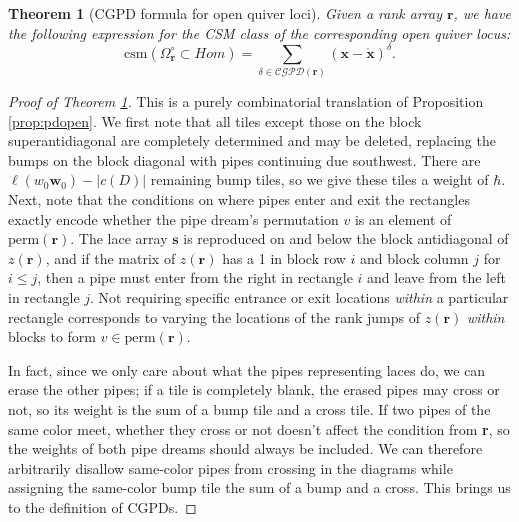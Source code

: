 \documentclass[10pt,a4paper]{amsart}
\newtheorem{theorem}{Theorem}
\newcommand{\csm}{\textrm{csm}}
\newcommand{\perm}{\textrm{perm}}
\begin{document}
\begin{theorem}[CGPD formula for open quiver loci]\label{thm:cgpdopen}
Given a rank array $\mathbf{r}$, we have the following expression for the CSM class of the corresponding open quiver locus:
\[\csm(\Omega_{\mathbf{r}}^\circ \subset Hom) = \sum_{\delta \in \mathcal{CGPD}(\mathbf{r})} (\mathbf{x}-\mathring{\mathbf{x}})^\delta.\]
\end{theorem}

\begin{proof}[Proof of Theorem \ref{thm:cgpdopen}]
This is a purely combinatorial translation of Proposition \ref{prop:pdopen}. We first note that all tiles except those on the block superantidiagonal are completely determined and may be deleted, replacing the bumps on the block diagonal with pipes continuing due southwest. There are $\ell(w_0\mathbf{w}_0)-|c(D)|$ remaining bump tiles, so we give these tiles a weight of $\hbar$. Next, note that the conditions on where pipes enter and exit the rectangles exactly encode whether the pipe dream's permutation $v$ is an element of $\perm(\mathbf{r})$. The lace array $\mathbf{s}$ is reproduced on and below the block antidiagonal of $z(\mathbf{r})$, and if the matrix of $z(\mathbf{r})$ has a 1 in block row $i$ and block column $j$ for $i \leq j$, then a pipe must enter from the right in rectangle $i$ and leave from the left in rectangle $j$.
Not requiring specific entrance or exit locations \emph{within} a particular rectangle corresponds to varying the locations of the rank jumps of $z(\mathbf{r})$ \emph{within} blocks to form $v \in \perm(\mathbf{r})$.

In fact, since we only care about what the pipes representing laces do, we can erase the other pipes; if a tile is completely blank, the erased pipes may cross or not, so its weight is the sum of a bump tile and a cross tile. If two pipes of the same color meet, whether they cross or not doesn't affect the condition from \textbf{r}, so the weights of both pipe dreams should always be included. We can therefore arbitrarily disallow same-color pipes from crossing in the diagrams while assigning the same-color bump tile the sum of a bump and a cross. This brings us to the definition of CGPDs.
\end{proof}
\end{document}
